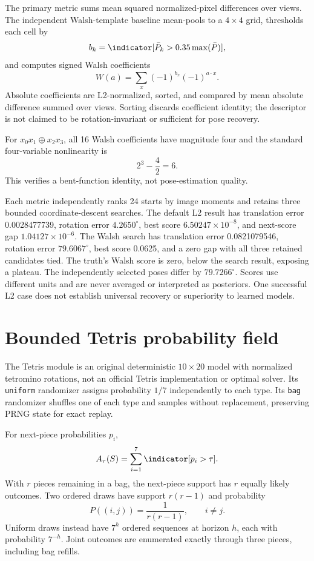The primary metric sums mean squared normalized-pixel differences over views. The independent Walsh-template baseline mean-pools to a $4\times4$ grid, thresholds each cell by
\begin{equation}
b_k=\indicator[\bar P_k>0.35\max(\bar P)],
\end{equation}
and computes signed Walsh coefficients
\begin{equation}
W(a)=\sum_x(-1)^{b_x}(-1)^{a\cdot x}.
\end{equation}
Absolute coefficients are L2-normalized, sorted, and compared by mean absolute difference summed over views. Sorting discards coefficient identity; the descriptor is not claimed to be rotation-invariant or sufficient for pose recovery.

For $x_0x_1\oplus x_2x_3$, all 16 Walsh coefficients have magnitude four and the standard four-variable nonlinearity is
\begin{equation}
2^3-\frac{4}{2}=6.
\end{equation}
This verifies a bent-function identity, not pose-estimation quality.

Each metric independently ranks 24 starts by image moments and retains three bounded coordinate-descent searches. The default L2 result has translation error 0.0028477739, rotation error $4.2650^\circ$, best score $6.50247\times10^{-8}$, and next-score gap $1.04127\times10^{-6}$. The Walsh search has translation error 0.0821079546, rotation error $79.6067^\circ$, best score 0.0625, and a zero gap with all three retained candidates tied. The truth's Walsh score is zero, below the search result, exposing a plateau. The independently selected poses differ by $79.7266^\circ$. Scores use different units and are never averaged or interpreted as posteriors. One successful L2 case does not establish universal recovery or superiority to learned models.

\section{Bounded Tetris probability field}
The Tetris module is an original deterministic $10\times20$ model with normalized tetromino rotations, not an official Tetris implementation or optimal solver. Its \texttt{uniform} randomizer assigns probability $1/7$ independently to each type. Its \texttt{bag} randomizer shuffles one of each type and samples without replacement, preserving PRNG state for exact replay.

For next-piece probabilities $p_i$,
\begin{equation}
A_\tau(S)=\sum_{i=1}^{7}\indicator[p_i>\tau].
\end{equation}
With $r$ pieces remaining in a bag, the next-piece support has $r$ equally likely outcomes. Two ordered draws have support $r(r-1)$ and probability
\begin{equation}
P((i,j))=\frac{1}{r(r-1)},\qquad i\neq j.
\end{equation}
Uniform draws instead have $7^h$ ordered sequences at horizon $h$, each with probability $7^{-h}$. Joint outcomes are enumerated exactly through three pieces, including bag refills.

